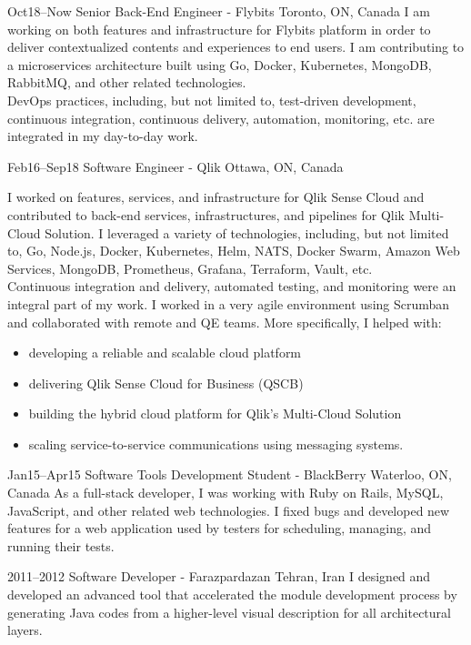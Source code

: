 \documentclass[]{cv-style}                     %
\begin{document}
\begin{entrylist}

  \entry
  {\small Oct18--Now}
  {Senior Back-End Engineer - Flybits}
  {Toronto, ON, Canada}
  {I am working on both features and infrastructure for Flybits platform in order to deliver contextualized contents and experiences to end users.
   I am contributing to a microservices architecture built using Go, Docker, Kubernetes, MongoDB, RabbitMQ, and other related technologies. \\
   DevOps practices, including, but not limited to, test-driven development, continuous integration, continuous delivery, automation, monitoring, etc. are integrated in my day-to-day work.}

  \entry
  {\small Feb16--Sep18}
  {Software Engineer - Qlik}
  {Ottawa, ON, Canada}
  {I worked on features, services, and infrastructure for Qlik Sense Cloud and
   contributed to back-end services, infrastructures, and pipelines for Qlik Multi-Cloud Solution.
   I leveraged a variety of technologies, including, but not limited to, Go, Node.js, Docker, Kubernetes, Helm,
   NATS, Docker Swarm, Amazon Web Services, MongoDB, Prometheus, Grafana, Terraform, Vault, etc. \\
   Continuous integration and delivery, automated testing, and monitoring were an integral part of my work.
   I worked in a very agile environment using Scrumban and collaborated with remote and QE teams.
   More specifically, I helped with:
     \begin{itemize}
         \item developing a reliable and scalable cloud platform
         \item delivering Qlik Sense Cloud for Business (QSCB)
         \item building the hybrid cloud platform for Qlik's Multi-Cloud Solution
         \item scaling service-to-service communications using messaging systems. 
     \end{itemize}
   }

  \entry
  {\small Jan15--Apr15}
  {Software Tools Development Student - BlackBerry}
  {Waterloo, ON, Canada}
  {As a full-stack developer, I was working with Ruby on Rails, MySQL, JavaScript, and other related web technologies.
   I fixed bugs and developed new features for a web application used by testers for scheduling, managing, and running their tests.}

  \entry
  {\small 2011--2012}
  {Software Developer - Farazpardazan}
  {Tehran, Iran}
  {I designed and developed an advanced tool that accelerated the module development process by
   generating Java codes from a higher-level visual description for all architectural layers.}


\end{entrylist}
\end{document}
